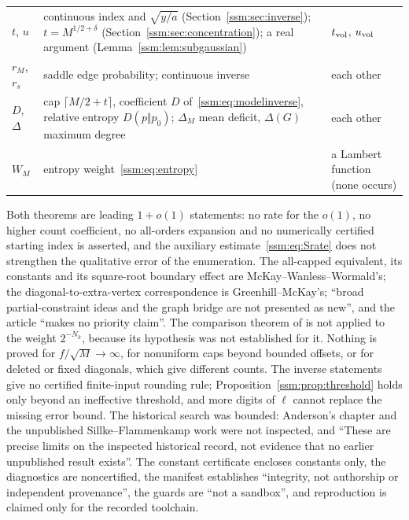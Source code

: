 \begin{minipage}{\textwidth}
\begin{tabular}{@{}>{\raggedright\arraybackslash}p{0.8in}>{\raggedright\arraybackslash}p{3.25in}>{\raggedright\arraybackslash}p{2.1in}@{}}
$t$, $u$ & continuous index and $\sqrt{y/a}$ (Section~\ref{ssm:sec:inverse}); $t=M^{1/2+\delta}$ (Section~\ref{ssm:sec:concentration}); a real argument (Lemma~\ref{ssm:lem:subgaussian}) & $t_{\rm vol}$, $u_{\rm vol}$\\
$r_M$, $r_s$ & saddle edge probability; continuous inverse & each other\\
$D$, $\Delta$ & cap $\lceil M/2+t\rceil$, coefficient $D$ of~\eqref{ssm:eq:modelinverse}, relative entropy $D(p\Vert p_0)$; $\Delta_M$ mean deficit, $\Delta(G)$ maximum degree & each other\\
$W_M$ & entropy weight~\eqref{ssm:eq:entropy} & a Lambert function (none occurs)\\
\bottomrule
\end{tabular}
\endgroup
\end{minipage}\par
\begin{writenote}
Both theorems are leading $1+o(1)$ statements: no rate for the $o(1)$, no
higher count coefficient, no all-orders expansion and no numerically
certified starting index is asserted, and the auxiliary
estimate~\eqref{ssm:eq:Srate} does not strengthen the qualitative error of
the enumeration. The all-capped equivalent, its constants and its
square-root boundary effect are McKay--Wanless--Wormald's; the
diagonal-to-extra-vertex correspondence is Greenhill--McKay's; ``broad
partial-constraint ideas and the graph bridge are not presented as new'',
and the article ``makes no priority claim''. The comparison theorem of
\cite[Theorem~3]{mww} is not applied to the weight $2^{-N_k}$, because its
hypothesis was not established for it. Nothing is proved for $f/\sqrt
M\to\infty$, for nonuniform caps beyond bounded offsets, or for deleted or
fixed diagonals, which give different counts. The inverse statements give
no certified finite-input rounding rule; Proposition~\ref{ssm:prop:threshold}
holds only beyond an ineffective threshold, and more digits of $\ell$ cannot
replace the missing error bound. The historical search was bounded:
Anderson's chapter and the unpublished Sillke--Flammenkamp work were not
inspected, and ``These are precise limits on the inspected historical
record, not evidence that no earlier unpublished result exists''. The
constant certificate encloses constants only, the diagnostics are
noncertified, the manifest establishes ``integrity, not authorship or
independent provenance'', the guards are ``not a sandbox'', and
reproduction is claimed only for the recorded toolchain.
\end{writenote}
